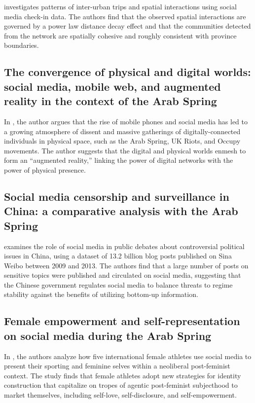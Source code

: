 \documentclass{article}
\begin{document}
\cite{Liu2013UncoveringPO} investigates patterns of inter-urban trips and spatial interactions using social media check-in data. The authors find that the observed spatial interactions are governed by a power law distance decay effect and that the communities detected from the network are spatially cohesive and roughly consistent with province boundaries.

\subsection{The convergence of physical and digital worlds: social media, mobile web, and augmented reality in the context of the Arab Spring}

In \cite{Jurgenson2012WhenAM}, the author argues that the rise of mobile phones and social media has led to a growing atmosphere of dissent and massive gatherings of digitally-connected individuals in physical space, such as the Arab Spring, UK Riots, and Occupy movements. The author suggests that the digital and physical worlds enmesh to form an ``augmented reality,'' linking the power of digital networks with the power of physical presence.

\subsection{Social media censorship and surveillance in China: a comparative analysis with the Arab Spring}

\cite{Qin2017WhyDC} examines the role of social media in public debates about controversial political issues in China, using a dataset of 13.2 billion blog posts published on Sina Weibo between 2009 and 2013. The authors find that a large number of posts on sensitive topics were published and circulated on social media, suggesting that the Chinese government regulates social media to balance threats to regime stability against the benefits of utilizing bottom-up information.

\subsection{Female empowerment and self-representation on social media during the Arab Spring}

In \cite{Toffoletti2018FemaleAS}, the authors analyze how five international female athletes use social media to present their sporting and feminine selves within a neoliberal post-feminist context. The study finds that female athletes adopt new strategies for identity construction that capitalize on tropes of agentic post-feminist subjecthood to market themselves, including self-love, self-disclosure, and self-empowerment.
\end{document}
